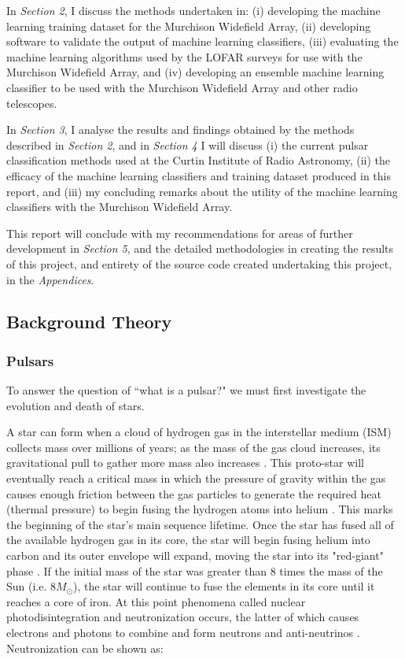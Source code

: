 \documentclass{article}
\begin{document}
In \emph{Section 2}, I discuss the methods undertaken in: (i) developing the machine learning training dataset for the Murchison Widefield Array, (ii) developing software to validate the output of machine learning classifiers, (iii) evaluating the machine learning algorithms used by the LOFAR surveys for use with the Murchison Widefield Array, and (iv) developing an ensemble machine learning classifier to be used with the Murchison Widefield Array and other radio telescopes.

In \emph{Section 3}, I analyse the results and findings obtained by the methods described in \emph{Section 2}, and in \emph{Section 4} I will discuss (i) the current pulsar classification methods used at the Curtin Institute of Radio Astronomy, (ii) the efficacy of the machine learning classifiers and training dataset produced in this report, and (iii) my concluding remarks about the utility of the machine learning classifiers with the Murchison Widefield Array.

This report will conclude with my recommendations for areas of further development in \emph{Section 5}, and the detailed methodologies in creating the results of this project, and entirety of the source code created undertaking this project, in the \emph{Appendices}.

\subsection{Background Theory}

\subsubsection{Pulsars}

To answer the question of ``what is a pulsar?" we must first investigate the evolution and death of stars.

A star can form when a cloud of hydrogen gas in the interstellar medium (ISM) collects mass over millions of years; as the mass of the gas cloud increases, its gravitational pull to gather more mass also increases \autocite{maoz}. This proto-star will eventually reach a critical mass in which the pressure of gravity within the gas causes enough friction between the gas particles to generate the required heat (thermal pressure) to begin fusing the hydrogen atoms into helium \autocite{maoz}. This marks the beginning of the star's main sequence lifetime. Once the star has fused all of the available hydrogen gas in its core, the star will begin fusing helium into carbon and its outer envelope will expand, moving the star into its "red-giant" phase \autocite{maoz}. If the initial mass of the star was greater than 8 times the mass of the Sun (i.e. $8M_{\odot}$), the star will continue to fuse the elements in its core until it reaches a core of iron. At this point phenomena called nuclear photodisintegration and neutronization occurs, the latter of which causes electrons and photons to combine and form neutrons and anti-neutrinos \autocite{maoz}. Neutronization can be shown as:
\end{document}

